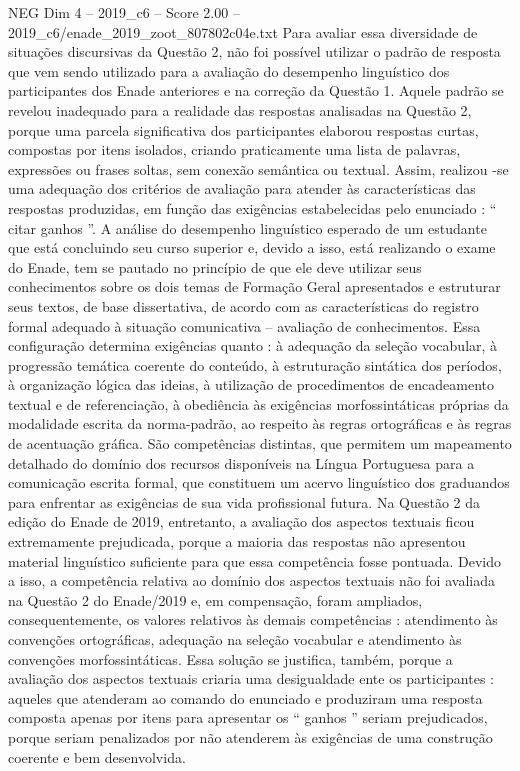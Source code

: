 \begin{textsample}{NEG Dim 4 – 2019\_c6 – Score 2.00 – 2019\_c6/enade\_2019\_zoot\_807802c04e.txt}
Para avaliar essa diversidade de situações discursivas da Questão 2, não foi possível utilizar o padrão de resposta que vem sendo utilizado para a avaliação do desempenho linguístico dos participantes dos Enade anteriores e na correção da Questão 1.
Aquele padrão se revelou inadequado para a realidade das respostas analisadas na Questão 2, porque uma parcela significativa dos participantes elaborou respostas curtas, compostas por itens isolados, criando praticamente uma lista de palavras, expressões ou frases soltas, sem conexão semântica ou textual.
Assim, realizou -se uma adequação dos critérios de avaliação para atender às características das respostas produzidas, em função das exigências estabelecidas pelo enunciado : “ citar ganhos ”.
A análise do desempenho linguístico esperado de um estudante que está concluindo seu curso superior e, devido a isso, está realizando o exame do Enade, tem se pautado no princípio de que ele deve utilizar seus conhecimentos sobre os dois temas de Formação Geral apresentados e estruturar seus textos, de base dissertativa, de acordo com as características do registro formal adequado à situação comunicativa – avaliação de conhecimentos.
Essa configuração determina exigências quanto : à adequação da seleção vocabular, à progressão temática coerente do conteúdo, à estruturação sintática dos períodos, à organização lógica das ideias, à utilização de procedimentos de encadeamento textual e de referenciação, à obediência às exigências morfossintáticas próprias da modalidade escrita da norma-padrão, ao respeito às regras ortográficas e às regras de acentuação gráfica.
São competências distintas, que permitem um mapeamento detalhado do domínio dos recursos disponíveis na Língua Portuguesa para a comunicação escrita formal, que constituem um acervo linguístico dos graduandos para enfrentar as exigências de sua vida profissional futura.
Na Questão 2 da edição do Enade de 2019, entretanto, a avaliação dos aspectos textuais ficou extremamente prejudicada, porque a maioria das respostas não apresentou material linguístico suficiente para que essa competência fosse pontuada.
Devido a isso, a competência relativa ao domínio dos aspectos textuais não foi avaliada na Questão 2 do Enade/2019 e, em compensação, foram ampliados, consequentemente, os valores relativos às demais competências : atendimento às convenções ortográficas, adequação na seleção vocabular e atendimento às convenções morfossintáticas.
Essa solução se justifica, também, porque a avaliação dos aspectos textuais criaria uma desigualdade ente os participantes : aqueles que atenderam ao comando do enunciado e produziram uma resposta composta apenas por itens para apresentar os “ ganhos ” seriam prejudicados, porque seriam penalizados por não atenderem às exigências de uma construção coerente e bem desenvolvida.

\end{textsample}
